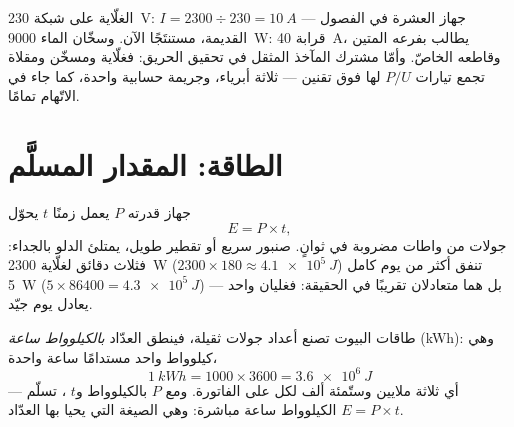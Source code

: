 \begin{example}\label{ex:g9:electric-power-energy:fuses}
الغلّاية على شبكة \qty{230}{V}: $I = 2300 \div 230 =
\qty{10}{A}$ --- جهاز العشرة  في الفصول القديمة، مستنتَجًا
الآن. وسخّان الماء \qty{9000}{W}: قرابة \qty{40}{A}، يطالب
بفرعه المتين وقاطعه الخاصّ. وأمّا مشترك المآخذ المثقل في تحقيق
الحريق: فغلّاية ومسخّن ومقلاة تجمع تيارات $P/U$ لها فوق تقنين
 --- ثلاثة أبرياء، وجريمة حسابية واحدة، كما جاء في
الاتّهام تمامًا.
\end{example}

\section{الطاقة: المقدار المسلَّم}

\begin{proposition}\label{prop:g9:electric-power-energy:Pt}
جهاز قدرته $P$ يعمل زمنًا $t$ يحوّل 
\[
E = P \times t ,
\]
جولات من واطات مضروبة في ثوانٍ. صنبور سريع أو تقطير طويل،
يمتلئ الدلو بالجداء: فثلاث دقائق لغلّاية \qty{2300}{W}
($2300 \times 180 \approx \qty{4.1e5}{J}$) تنفق أكثر من يوم
كامل  \qty{5}{W} ($5 \times 86400 = \qty{4.3e5}{J}$)
--- بل هما متعادلان تقريبًا في الحقيقة: فغليان واحد يعادل يوم
 جيّد.
\end{proposition}

\begin{definition}\label{def:g9:electric-power-energy:kwh}
طاقات البيوت تصنع أعداد جولات ثقيلة، فينطق العدّاد
\emph{بالكيلوواط ساعة} (\unit{kWh}): وهي
 كيلوواط واحد مستدامًا ساعة واحدة،
\[
\qty{1}{kWh} = 1000 \times 3600 = \qty{3.6e6}{J}
\]
--- أي ثلاثة ملايين وستّمئة ألف  لكل  على الفاتورة.
ومع $P$ بالكيلوواط و$t$ ، تسلّم $E = P \times t$
الكيلوواط ساعة مباشرة: وهي الصيغة التي يحيا بها العدّاد.
\end{definition}

